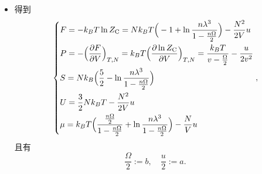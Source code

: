 \begin{itemize}
	\item 得到
	\begin{equation}
		\begin{dcases}
			F = - k_B T \ln Z_\text{C} = N k_B T \Big( - 1 + \ln \frac{n \lambda^3}{1 - \frac{n \Omega}{2}} \Big) - \frac{N^2}{2 V} u \\
			P = - \Big( \frac{\partial F}{\partial V} \Big)_{T, N} = k_B T \Big( \frac{\partial \ln Z_\text{C}}{\partial V} \Big)_{T, N} = \frac{k_B T}{v - \frac{\Omega}{2}} - \frac{u}{2 v^2} \\
			S = N k_B \Big( \frac{5}{2} - \ln \frac{n \lambda^3}{1 - \frac{n \Omega}{2}} \Big) \\
			U = \frac{3}{2} N k_B T - \frac{N^2}{2 V} u \\
			\mu = k_B T \Big( \frac{\frac{n \Omega}{2}}{1 - \frac{n \Omega}{2}} + \ln \frac{n \lambda^3}{1 - \frac{n \Omega}{2}} \Big) - \frac{N}{V} u
		\end{dcases},
	\end{equation}
	且有
	\begin{equation}
		\frac{\Omega}{2} := b, \quad \frac{u}{2} := a.
	\end{equation}
\end{itemize}

